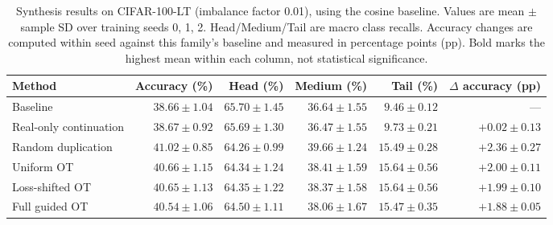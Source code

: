\begin{table}[t]
\centering
\small
\setlength{\tabcolsep}{4pt}
\caption{Synthesis results on CIFAR-100-LT (imbalance factor 0.01), using the cosine baseline. Values are mean $\pm$ sample SD over training seeds 0, 1, 2. Head/Medium/Tail are macro class recalls. Accuracy changes are computed within seed against this family's baseline and measured in percentage points (pp). Bold marks the highest mean within each column, not statistical significance.}
\label{tab:ot-synthesis}
\begin{tabular}{lrrrrr}
\toprule
Method & Accuracy (\%) & Head (\%) & Medium (\%) & Tail (\%) & $\Delta$ accuracy (pp) \\
\midrule
Baseline & $38.66 \pm 1.04$ & $\boldsymbol{65.70 \pm 1.45}$ & $36.64 \pm 1.55$ & $9.46 \pm 0.12$ & --- \\
Real-only continuation & $38.67 \pm 0.92$ & $65.69 \pm 1.30$ & $36.47 \pm 1.55$ & $9.73 \pm 0.21$ & $+0.02 \pm 0.13$ \\
Random duplication & $\boldsymbol{41.02 \pm 0.85}$ & $64.26 \pm 0.99$ & $\boldsymbol{39.66 \pm 1.24}$ & $15.49 \pm 0.28$ & $\boldsymbol{+2.36 \pm 0.27}$ \\
Uniform OT & $40.66 \pm 1.15$ & $64.34 \pm 1.24$ & $38.41 \pm 1.59$ & $\boldsymbol{15.64 \pm 0.56}$ & $+2.00 \pm 0.11$ \\
Loss-shifted OT & $40.65 \pm 1.13$ & $64.35 \pm 1.22$ & $38.37 \pm 1.58$ & $\boldsymbol{15.64 \pm 0.56}$ & $+1.99 \pm 0.10$ \\
Full guided OT & $40.54 \pm 1.06$ & $64.50 \pm 1.11$ & $38.06 \pm 1.67$ & $15.47 \pm 0.35$ & $+1.88 \pm 0.05$ \\
\bottomrule
\end{tabular}
\end{table}
